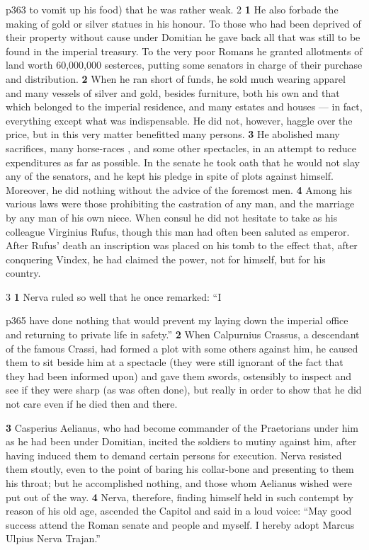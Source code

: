 p363 to vomit up his food) that he was rather weak. 2 \textbf{1} He also forbade the making of gold or silver statues in his honour. To those who had been deprived of their property without cause under Domitian he gave back all that was still to be found in the imperial treasury. To the very poor Romans he granted allotments of land worth 60,000,000 sesterces, putting some senators in charge of their purchase and distribution. \textbf{2} When he ran short of funds, he sold much wearing apparel and many vessels of silver and gold, besides furniture, both his own and that which belonged to the imperial residence, and many estates and houses \texthebrew{—} in fact, everything except what was indispensable. He did not, however, haggle over the price, but in this very matter benefitted many persons. \textbf{3} He abolished many sacrifices, many horse-races , and some other spectacles, in an attempt to reduce expenditures as far as possible. In the senate he took oath that he would not slay any of the senators, and he kept his pledge in spite of plots against himself. Moreover, he did nothing without the advice of the foremost men. \textbf{4} Among his various laws were those prohibiting the castration of any man, and the marriage by any man of his own niece. When consul he did not hesitate to take as his colleague Virginius Rufus, though this man had often been saluted as emperor. After Rufus' death an inscription was placed on his tomb to the effect that, after conquering Vindex, he had claimed the power, not for himself, but for his country.

3 \textbf{1} Nerva ruled so well that he once remarked: ``I

p365 have done nothing that would prevent my laying down the imperial office and returning to private life in safety.'' \textbf{2} When Calpurnius Crassus, a descendant of the famous Crassi, had formed a plot with some others against him, he caused them to sit beside him at a spectacle (they were still ignorant of the fact that they had been informed upon) and gave them swords, ostensibly to inspect and see if they were sharp (as was often done), but really in order to show that he did not care even if he died then and there.

\textbf{3} Casperius Aelianus, who had become commander of the Praetorians under him as he had been under Domitian, incited the soldiers to mutiny against him, after having induced them to demand certain persons for execution. Nerva resisted them stoutly, even to the point of baring his collar-bone and presenting to them his throat; but he accomplished nothing, and those whom Aelianus wished were put out of the way. \textbf{4} Nerva, therefore, finding himself held in such contempt by reason of his old age, ascended the Capitol and said in a loud voice: ``May good success attend the Roman senate and people and myself. I hereby adopt Marcus Ulpius Nerva Trajan.''

